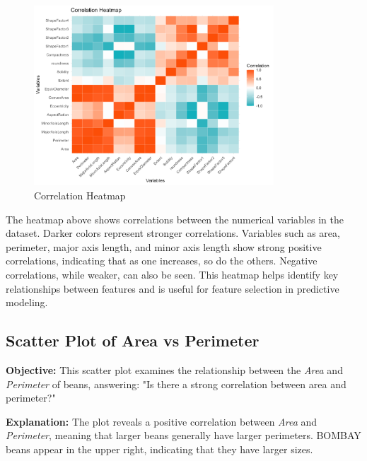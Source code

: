 \documentclass[a4paper,12pt]{article}
\begin{document}
\begin{figure}[H]
    \centering
    \includegraphics[width=0.8\textwidth]{graphs/correlation_heatmap.png}
    \caption{Correlation Heatmap}
    \label{fig:correlation_heatmap}
\end{figure}
The heatmap above shows correlations between the numerical variables in the dataset. Darker colors represent stronger correlations. Variables such as area, perimeter, major axis length, and minor axis length show strong positive correlations, indicating that as one increases, so do the others. Negative correlations, while weaker, can also be seen. This heatmap helps identify key relationships between features and is useful for feature selection in predictive modeling.

\newpage

\subsection{Scatter Plot of Area vs Perimeter}
\noindent\textbf{Objective:} This scatter plot examines the relationship between the \textit{Area} and \textit{Perimeter} of beans, answering: "Is there a strong correlation between area and perimeter?"

\noindent\textbf{Explanation:} The plot reveals a positive correlation between \textit{Area} and \textit{Perimeter}, meaning that larger beans generally have larger perimeters. BOMBAY beans appear in the upper right, indicating that they have larger sizes.
\end{document}
